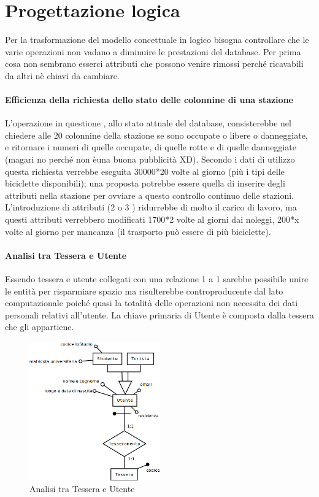 \documentclass[a4paper,twoside]{article}
\begin{document}
\section{Progettazione logica}
Per la trasformazione del modello concettuale in logico bisogna controllare che le varie operazioni non vadano a diminuire le prestazioni del database.\newline
Per prima cosa non sembrano esserci attributi che possono venire rimossi perché ricavabili da altri nè chiavi da cambiare.

\paragraph{Efficienza della richiesta dello stato delle colonnine di una stazione}
L'operazione in questione , allo stato attuale del database, consisterebbe nel chiedere alle 20 colonnine della stazione se sono occupate o libere o danneggiate, e ritornare i numeri di quelle occupate, di quelle rotte e di quelle danneggiate (magari no perché non èuna buona pubblicità XD).\newline
Secondo i dati di utilizzo questa richiesta verrebbe eseguita 30000*20 volte al giorno (più i tipi delle biciclette disponibili); una proposta potrebbe essere quella di inserire degli attributi nella stazione per ovviare a questo controllo continuo delle stazioni.\newline
L'introduzione di attributi (2 o 3 ) ridurrebbe di molto il carico di lavoro, ma questi attributi verrebbero modificati 1700*2 volte al giorni dai noleggi, 200*x volte al giorno per mancanza (il trasporto può essere di più biciclette).

\paragraph{Analisi tra Tessera e Utente}
Essendo tessera e utente collegati con una relazione 1 a 1 sarebbe possibile unire le entità per risparmiare spazio ma risulterebbe controproducente dal lato computazionale poiché quasi la totalità delle operazioni non necessita dei dati personali relativi all'utente. \newline
La chiave primaria di Utente è composta dalla tessera che gli appartiene.
\begin{figure}[H]
	\centering
	\includegraphics[width=0.5\textwidth]{Immagini-Grafici/Logico01.png}
	\caption{Analisi tra Tessera e Utente}
\end{figure}
\end{document}

